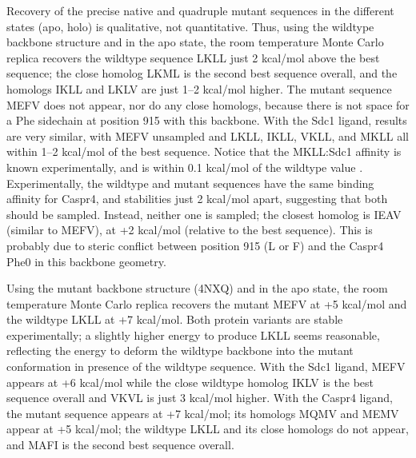 \documentclass[12pt]{article}
\begin{document}
Recovery of the precise native and quadruple mutant sequences in the different states (apo, holo) is qualitative, not quantitative.
Thus, using the wildtype backbone structure and in the apo state, the room temperature Monte Carlo replica recovers the wildtype
sequence LKLL just 2 kcal/mol above the best sequence; the close homolog LKML is the second best sequence overall, and the homologs
IKLL and LKLV are just 1--2 kcal/mol higher. The mutant sequence MEFV does not appear, nor do any close homologs, because there
is not space for a Phe sidechain at position 915 with this backbone. With the Sdc1 ligand, results are very similar, with MEFV
unsampled and LKLL, IKLL, VKLL, and MKLL all within 1--2 kcal/mol of the best sequence. Notice that the MKLL:Sdc1 affinity is
known experimentally, and is within 0.1 kcal/mol of the wildtype value \cite{Sheperd11}. Experimentally, the wildtype and mutant
sequences have the same binding affinity for Caspr4, and stabilities just 2 kcal/mol apart, suggesting that both should be sampled.
Instead, neither one is sampled; the closest homolog is IEAV (similar to MEFV), at +2 kcal/mol (relative to the best sequence).
This is probably due to steric conflict between position 915 (L or F) and the Caspr4 Phe0 in this backbone geometry.

Using the mutant backbone structure (4NXQ) and in the apo state, the room temperature Monte Carlo replica recovers the mutant MEFV
at +5 kcal/mol and the wildtype LKLL at +7 kcal/mol. Both protein variants are stable experimentally; a slightly higher energy to
produce LKLL seems reasonable, reflecting the energy to deform the wildtype backbone into the mutant conformation in presence of
the wildtype sequence. With the Sdc1 ligand, MEFV appears at +6 kcal/mol while the close wildtype homolog IKLV is the best sequence
overall and VKVL is just 3 kcal/mol higher. With the Caspr4 ligand, the mutant sequence appears at +7 kcal/mol; its homologs MQMV
and MEMV appear at +5 kcal/mol; the wildtype LKLL and its close homologs do not appear, and MAFI is the second best sequence overall.
\end{document}
